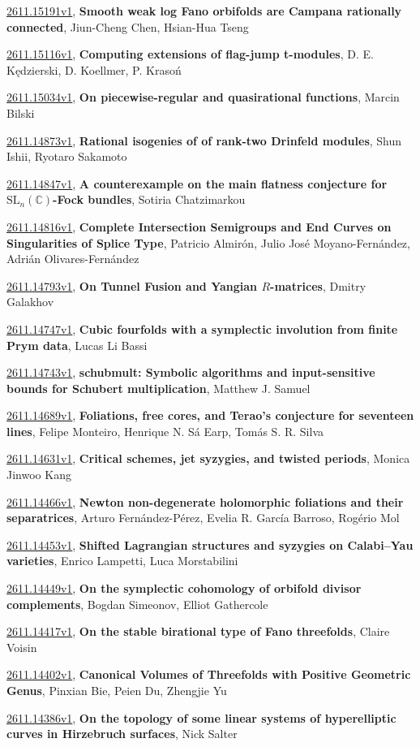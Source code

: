 \documentclass[9pt, a4paper]{article}
\theoremstyle{plain}
\theoremstyle{definition}
\theoremstyle{remark}
\newcommand{\arxiv}[3]{\href{https://arxiv.org/abs/#1}{#1}, \textbf{\textcolor{arxivblue}{#2}}, #3}
\begin{document}
\arxiv{2611.15191v1}{Smooth weak log Fano orbifolds are Campana rationally connected}{Jiun-Cheng Chen, Hsian-Hua Tseng}

\arxiv{2611.15116v1}{Computing extensions of flag-jump t-modules}{D. E. Kędzierski, D. Koellmer, P. Krasoń}

\arxiv{2611.15034v1}{On piecewise-regular and quasirational functions}{Marcin Bilski}

\arxiv{2611.14873v1}{Rational isogenies of of rank-two Drinfeld modules}{Shun Ishii, Ryotaro Sakamoto}

\arxiv{2611.14847v1}{A counterexample on the main flatness conjecture for $\mathrm{SL}_n(\mathbb{C})$-Fock bundles}{Sotiria Chatzimarkou}

\arxiv{2611.14816v1}{Complete Intersection Semigroups and End Curves on Singularities of Splice Type}{Patricio Almirón, Julio José Moyano-Fernández, Adrián Olivares-Fernández}

\arxiv{2611.14793v1}{On Tunnel Fusion and Yangian $R$-matrices}{Dmitry Galakhov}

\arxiv{2611.14747v1}{Cubic fourfolds with a symplectic involution from finite Prym data}{Lucas Li Bassi}

\arxiv{2611.14743v1}{schubmult: Symbolic algorithms and input-sensitive bounds for Schubert multiplication}{Matthew J. Samuel}

\arxiv{2611.14689v1}{Foliations, free cores, and Terao's conjecture for seventeen lines}{Felipe Monteiro, Henrique N. Sá Earp, Tomás S. R. Silva}

\arxiv{2611.14631v1}{Critical schemes, jet syzygies, and twisted periods}{Monica Jinwoo Kang}

\arxiv{2611.14466v1}{Newton non-degenerate holomorphic foliations and their separatrices}{Arturo Fernández-Pérez, Evelia R. García Barroso, Rogério Mol}

\arxiv{2611.14453v1}{Shifted Lagrangian structures and syzygies on Calabi--Yau varieties}{Enrico Lampetti, Luca Morstabilini}

\arxiv{2611.14449v1}{On the symplectic cohomology of orbifold divisor complements}{Bogdan Simeonov, Elliot Gathercole}

\arxiv{2611.14417v1}{On the stable birational type of Fano threefolds}{Claire Voisin}

\arxiv{2611.14402v1}{Canonical Volumes of Threefolds with Positive Geometric Genus}{Pinxian Bie, Peien Du, Zhengjie Yu}

\arxiv{2611.14386v1}{On the topology of some linear systems of hyperelliptic curves in Hirzebruch surfaces}{Nick Salter}
\end{document}

